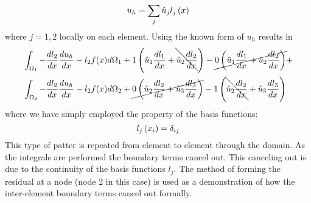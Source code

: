  \begin{equation}
 u_{h} = \sum_{j} \hat{u}_{j} l_{j}\left( x \right)
 \end{equation}
 where $j = 1,2$ locally on each element.  Using the known form of $u_{h}$ results in 
 \begin{equation}
 \begin{split}
 &\int_{\Omega_{1} } -\frac{d l_{2}}{d x}\frac{d u_{h}}{d x} - l_{2} f(x) d \Omega_{1} + 1\left(  \hat{u}_{1} \frac{d l_{1}}{d x} + \bcancel{\hat{u}_{2}\frac{d l_{2}}{d x}}  \right)  -\cancel{ 0\left(   \hat{u}_{1} \frac{d l_{1}}{d x} + \hat{u}_{2}\frac{d l_{2}}{d x}  \right) }+ \\ 
  &\int_{\Omega_{2} } -\frac{d l_{2}}{d x}\frac{d u_{h}}{d x} - l_{2} f(x) d \Omega_{2} + \cancel{0\left(  \hat{u}_{2} \frac{d l_{2}}{d x} + \hat{u}_{3}\frac{d l_{3}}{d x}  \right) } - 1\left(  \bcancel{ \hat{u}_{2} \frac{d l_{2}}{d x}} + \hat{u}_{3}\frac{d l_{3}}{d x}  \right)
 \end{split}
 \end{equation}
 where we have simply employed the property of the basis functions:
 \begin{equation}
 l_{j}\left( x_{i} \right) = \delta_{ij}
\end{equation}
This type of patter is repeated from element to element through the domain.  As the integrals are performed the boundary terms cancel out.  This canceling out is due to the continuity of the basis functions $l_{j}$.  The method of forming the residual at a node (node 2 in this case) is used as a demonstration of how the inter-element boundary terms cancel out formally.


